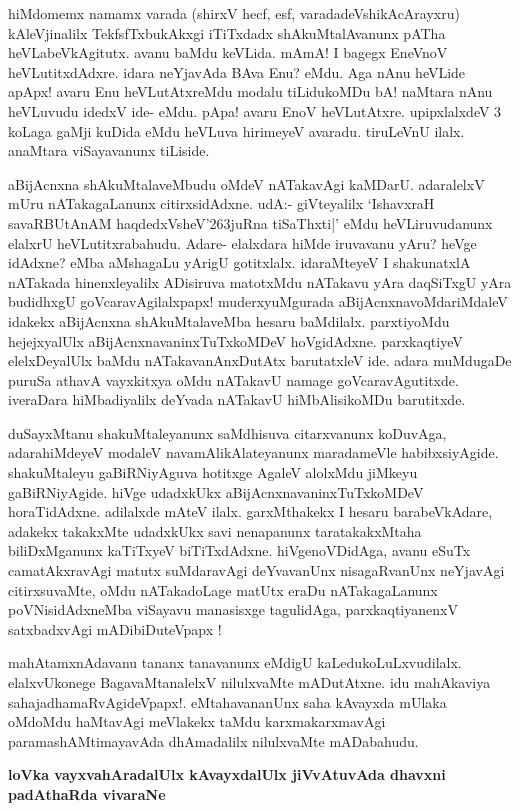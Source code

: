 \noindent
hiMdomemx namamx varada (shirxV hecf, esf, varadadeVshikAcArayxru) kAleVjinalilx TekfsfTxbukAkxgi iTiTxdadx shAkuMtalAvanunx pATha heVLabeVkAgitutx. avanu baMdu keVLida. mAmA! I bagegx EneVnoV heVLu\-titxdAdxre. idara neYjavAda BAva Enu? eMdu. Aga nAnu heVLide apApx! avaru Enu heVLutAtxreMdu modalu tiLidukoMDu bA! naMtara nAnu heVLuvudu idedxV ide- eMdu. pApa! avaru EnoV heVLutAtxre. upipxlalxdeV 3 koLaga gaMji kuDida eMdu heVLuva hirimeyeV avaradu. tiruLeVnU ilalx. anaMtara viSayavanunx tiLiside. 

aBijAcnxna shAkuMtalaveMbudu oMdeV nATakavAgi kaMDarU. adaralelxV mUru nATakagaLanunx citirxsidAdxne. udA:- giVteyalilx `IshavxraH savaRBUtAnAM haqdedxVsheV\char'263juRna tiSaThxti|'\label{235} eMdu heVLiruvudanunx elalxrU heVLutitxrabahudu. Adare- elalxdara hiMde iruvavanu yAru? heVge idAdxne? eMba aMshagaLu yArigU gotitxlalx. idaraMteyeV I shakunatxlA nATakada hinenxleyalilx ADisiruva matotxMdu nATakavu yAra daqSiTxgU yAra budidhxgU goVcaravAgilalxpapx! muderxyuMgurada aBijAcnxnavoMdariMdaleV idakekx aBijAcnxna shAkuMtalaveMba hesaru baMdilalx. parxtiyoMdu hejejxyalUlx aBijAcnxnavaninxTuTxkoMDeV hoVgidAdxne. parxkaqtiyeV elelxDeyalUlx baMdu nATakavanAnxDutAtx barutatxleV ide. adara muMdugaDe puruSa athavA vayxkitxya oMdu nATakavU namage goVcaravAgutitxde. iveraDara hiMbadiyalilx deYvada nATakavU hiMbAlisikoMDu barutitxde.

duSayxMtanu shakuMtaleyanunx saMdhisuva citarxvanunx koDuvAga, adara\break hiMdeyeV modaleV navamA\-likAlateyanunx maradameVle habibxsiyAgide. shakuM\-taleyu gaBiRNiyAguva hotitxge AgaleV alolxMdu jiMkeyu gaBiRNiyAgide. hiVge udadxkUkx aBijAcnxnavaninxTuTxkoMDeV horaTidAdxne. adilalxde mAteV\- ilalx. garxMthakekx I hesaru barabeVkAdare, adakekx takakxMte udadxkUkx savi nenapanunx taratakakxMtaha biliDxM\-ganunx kaTiTxyeV biTiTxdAdxne. hiVgenoVDidAga, avanu eSuTx camatAkxravAgi matutx suMdaravAgi deYvavanUnx nisagaR\-vanUnx neYjavAgi citirxsuvaMte, oMdu nATakadoLage matUtx eraDu nATakagaLanunx poVNisidAdx\-neMba viSayavu manasisxge tagulidAga, parxkaqtiyanenxV satxbadxvAgi mADibiDuteVpapx !

mahAtamxnAdavanu tananx tanavanunx eMdigU kaLedukoLuLxvudilalx. elalxvU\break konege BagavaMtanalelxV nilulxvaMte mADutAtxne. idu mahAkaviya sahajadhamaR\-vAgideVpapx!. eMtahavananUnx saha kAvayxda mUlaka oMdoMdu haMtavAgi meVlakekx taMdu karxmakarxmavAgi paramashAMtimayavAda dhAmadalilx nilulxvaMte mADabahudu.

{\bigskip
\noindent
{\large\bf loVka vayxvahAradalUlx kAvayxdalUlx jiVvAtuvAda dhavxni padAthaRda vivaraNe}}\label{page235}
\medskip

